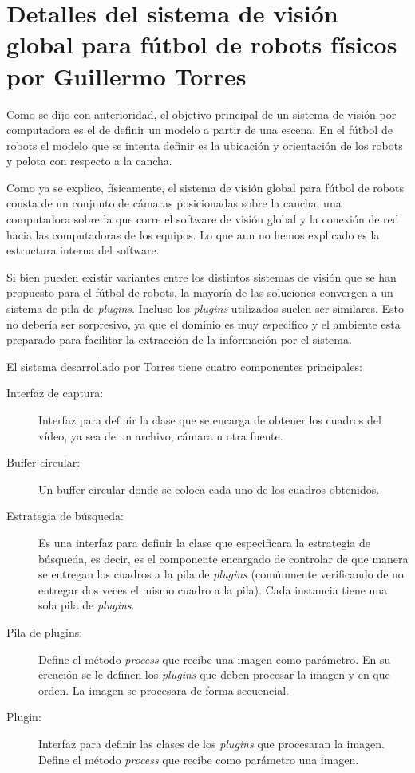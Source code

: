 
\section{Detalles del sistema de visión global para fútbol de robots físicos por
Guillermo Torres}

Como se dijo con anterioridad, el objetivo principal de un sistema de visión por
computadora es el de definir un modelo a partir de una escena. En el fútbol de
robots el modelo que se intenta definir es la ubicación y orientación de los
robots y pelota con respecto a la cancha.

Como ya se explico, físicamente, el sistema de visión global para fútbol de
robots consta de un conjunto de cámaras posicionadas sobre la cancha, una
computadora sobre la que corre el software de visión global y la conexión de red
hacia las computadoras de los equipos. Lo que aun no hemos explicado es la
estructura interna del software.

Si bien pueden existir variantes entre los distintos sistemas de visión que se
han propuesto para el fútbol de robots, la mayoría de las soluciones convergen a
un sistema de pila de \emph{plugins}. Incluso los \emph{plugins} utilizados
suelen ser similares. Esto no debería ser sorpresivo, ya que el dominio es muy
especifico y el ambiente esta preparado para facilitar la extracción de la
información por el sistema.

El sistema desarrollado por Torres tiene cuatro componentes principales:

\begin{description}

	\item[Interfaz de captura:] Interfaz para definir la clase que se
		encarga de obtener los cuadros del vídeo, ya sea de un archivo,
		cámara u otra fuente.

	\item[Buffer circular:] Un buffer circular donde se coloca cada uno de
		los cuadros obtenidos.

	\item[Estrategia de búsqueda:] Es una interfaz para definir la clase que
		especificara la estrategia de búsqueda, es decir, es el
		componente encargado de controlar de que manera se entregan los
		cuadros a la pila de \emph{plugins} (comúnmente verificando de
		no entregar dos veces el mismo cuadro a la pila). Cada instancia
		tiene una sola pila de \emph{plugins}.
	
	\item[Pila de plugins:] Define el método \emph{process} que recibe una
		imagen como parámetro. En su creación se le definen los
		\emph{plugins} que deben procesar la imagen y en que orden. La
		imagen se procesara de forma secuencial.

	\item[Plugin:] Interfaz para definir las clases de los \emph{plugins}
		que procesaran la imagen. Define el método \emph{process} que
		recibe como parámetro una imagen.

\end{description}

